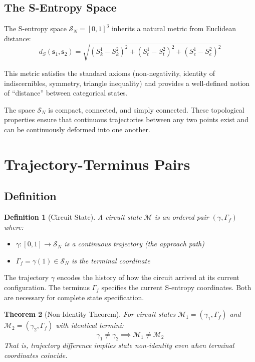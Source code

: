 \documentclass[aps,prl,twocolumn,superscriptaddress,showpacs]{revtex4-2}
\newtheorem{theorem}{Theorem}[section]
\newtheorem{definition}[theorem]{Definition}
\newcommand{\Sspace}{\mathcal{S}}
\newcommand{\Sk}{S_k}
\newcommand{\St}{S_t}
\newcommand{\Se}{S_e}
\newcommand{\traj}{\gamma}
\newcommand{\term}{\Gamma}
\begin{document}
\subsection{The S-Entropy Space}

The S-entropy space $\Sspace_N = [0,1]^3$ inherits a natural metric from Euclidean distance:
\begin{equation}
d_S(\mathbf{s}_1, \mathbf{s}_2) = \sqrt{(\Sk^1 - \Sk^2)^2 + (\St^1 - \St^2)^2 + (\Se^1 - \Se^2)^2}
\end{equation}

This metric satisfies the standard axioms (non-negativity, identity of indiscernibles, symmetry, triangle inequality) and provides a well-defined notion of ``distance'' between categorical states.

The space $\Sspace_N$ is compact, connected, and simply connected. These topological properties ensure that continuous trajectories between any two points exist and can be continuously deformed into one another.

\section{Trajectory-Terminus Pairs}
\label{sec:trajectory}

\subsection{Definition}

\begin{definition}[Circuit State]
A circuit state $\mathcal{M}$ is an ordered pair $(\traj, \term_f)$ where:
\begin{itemize}
\item $\traj: [0,1] \to \Sspace_N$ is a continuous trajectory (the approach path)
\item $\term_f = \traj(1) \in \Sspace_N$ is the terminal coordinate
\end{itemize}
\end{definition}

The trajectory $\traj$ encodes the history of how the circuit arrived at its current configuration. The terminus $\term_f$ specifies the current S-entropy coordinates. Both are necessary for complete state specification.

\begin{theorem}[Non-Identity Theorem]
\label{thm:nonidentity}
For circuit states $\mathcal{M}_1 = (\traj_1, \term_f)$ and $\mathcal{M}_2 = (\traj_2, \term_f)$ with identical termini:
\begin{equation}
\traj_1 \neq \traj_2 \implies \mathcal{M}_1 \neq \mathcal{M}_2
\end{equation}
That is, trajectory difference implies state non-identity even when terminal coordinates coincide.
\end{theorem}
\end{document}
